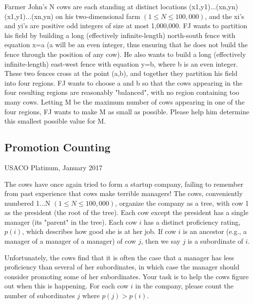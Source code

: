 \documentclass[11pt]{article}
\begin{document}
Farmer John's N cows are each standing at distinct locations (x1,y1)...(xn,yn) (x1,y1)...(xn,yn) on his two-dimensional farm $(1\leq N\leq 100,000)$, and the xi's and yi's are positive odd integers of size at most 1,000,000. FJ wants to partition his field by building a long (effectively infinite-length) north-south fence with equation x=a (a will be an even integer, thus ensuring that he does not build the fence through the position of any cow). He also wants to build a long (effectively infinite-length) east-west fence with equation y=b, where b is an even integer. These two fences cross at the point (a,b), and together they partition his field into four regions.
FJ wants to choose a and b so that the cows appearing in the four resulting regions are reasonably "balanced", with no region containing too many cows. Letting M be the maximum number of cows appearing in one of the four regions, FJ wants to make M as small as possible. Please help him determine this smallest possible value for M.

\subsection{Promotion Counting}
USACO Platinum, January 2017

The cows have once again tried to form a startup company, failing to remember from past experience that cows make terrible managers!
The cows, conveniently numbered 1...N $(1\leq N\leq 100,000)$, organize the company as a tree, with cow 1 as the president (the root of the tree). Each cow except the president has a single manager (its "parent" in the tree). Each cow $i$ has a distinct proficiency rating, $p(i)$, which describes how good she is at her job. If cow $i$ is an ancestor (e.g., a manager of a manager of a manager) of cow $j$, then we say $j$ is a subordinate of $i$.

Unfortunately, the cows find that it is often the case that a manager has less proficiency than several of her subordinates, in which case the manager should consider promoting some of her subordinates. Your task is to help the cows figure out when this is happening. For each cow $i$ in the company, please count the number of subordinates $j$ where $p(j)>p(i)$.
\end{document}
